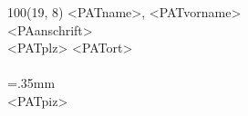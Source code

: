 \documentclass[12pt]{g-brief}
\begin{document}
{
\scriptsize
\begin{textblock}{100}(19, 8) 
\noindent <PATname>, <PATvorname>\\
<PAanschrift>\\
<PATplz> <PATort>\\\\
\X=.35mm        %
\barheight=1cm %
\\
<PATpiz>\\
\end{textblock}
}
\newcommand{\Top}{\rule{0pt}{2.6ex}}       %
\newcommand{\Bot}{\rule[-1.2ex]{0pt}{0pt}} %

\newcommand*{\srule}[2][0pt]{\setbox0\hbox{#2}\rule[#1]{\wd0}{0.4pt}}


\makeatletter
\newcommand{\cellwidth}{\TX@col@width}
\makeatother

\end{document}
